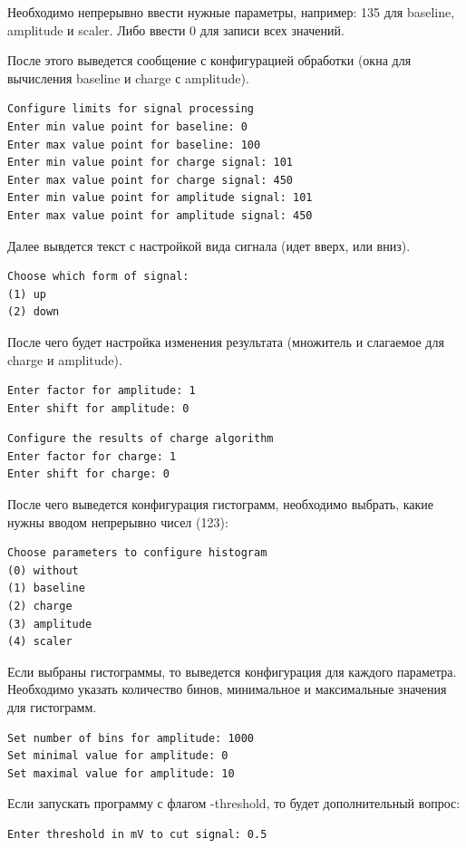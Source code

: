 \documentclass[12pt,a4paper,openany]{article}
\begin{document}
Необходимо непрерывно ввести нужные параметры, например: 135 для baseline, amplitude и scaler.
Либо ввести 0 для записи всех значений.

После этого выведется сообщение с конфигурацией обработки (окна для вычисления baseline и charge с amplitude).
\begin{lstlisting}
Configure limits for signal processing
Enter min value point for baseline: 0
Enter max value point for baseline: 100
Enter min value point for charge signal: 101
Enter max value point for charge signal: 450
Enter min value point for amplitude signal: 101
Enter max value point for amplitude signal: 450
\end{lstlisting}

Далее вывдется текст с настройкой вида сигнала (идет вверх, или вниз).
\begin{lstlisting}
Choose which form of signal:
(1) up
(2) down
\end{lstlisting}

После чего будет настройка изменения результата (множитель и слагаемое для charge и amplitude).
\begin{lstlisting}
Enter factor for amplitude: 1
Enter shift for amplitude: 0
\end{lstlisting}

\begin{lstlisting}
Configure the results of charge algorithm
Enter factor for charge: 1
Enter shift for charge: 0
\end{lstlisting}

После чего выведется конфигурация гистограмм, необходимо выбрать, какие нужны вводом непрерывно чисел (123):
\begin{lstlisting}
Choose parameters to configure histogram
(0) without
(1) baseline
(2) charge
(3) amplitude
(4) scaler
\end{lstlisting}

Если выбраны гистограммы, то выведется конфигурация для каждого параметра. 
Необходимо указать количество бинов, минимальное и максимальные значения для гистограмм.
\begin{lstlisting}
Set number of bins for amplitude: 1000
Set minimal value for amplitude: 0
Set maximal value for amplitude: 10
\end{lstlisting}

Если запускать программу с флагом -threshold, то будет дополнительный вопрос:
\begin{lstlisting}
Enter threshold in mV to cut signal: 0.5
\end{lstlisting}
\end{document}
